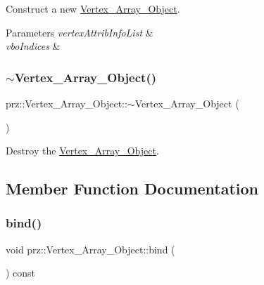 Construct a new \mbox{\hyperlink{classprz_1_1_vertex___array___object}{Vertex\+\_\+\+Array\+\_\+\+Object}}. 


\begin{DoxyParams}{Parameters}
{\em vertex\+Attrib\+Info\+List} & \\
\hline
{\em vbo\+Indices} & \\
\hline
\end{DoxyParams}
\mbox{\label{classprz_1_1_vertex___array___object_a9a9af420f5ea9d334d25d610025b9083}} 
\subsubsection{\texorpdfstring{$\sim$Vertex\_Array\_Object()}{~Vertex\_Array\_Object()}}
{\footnotesize\ttfamily prz\+::\+Vertex\+\_\+\+Array\+\_\+\+Object\+::$\sim$\+Vertex\+\_\+\+Array\+\_\+\+Object (\begin{DoxyParamCaption}{ }\end{DoxyParamCaption})\hspace{0.3cm}{\ttfamily [inline]}}



Destroy the \mbox{\hyperlink{classprz_1_1_vertex___array___object}{Vertex\+\_\+\+Array\+\_\+\+Object}}. 



\subsection{Member Function Documentation}
\mbox{\label{classprz_1_1_vertex___array___object_aeb2ecc81c998fd8565786b0a961f9cb7}} 
\subsubsection{\texorpdfstring{bind()}{bind()}}
{\footnotesize\ttfamily void prz\+::\+Vertex\+\_\+\+Array\+\_\+\+Object\+::bind (\begin{DoxyParamCaption}{ }\end{DoxyParamCaption}) const\hspace{0.3cm}{\ttfamily [inline]}}



